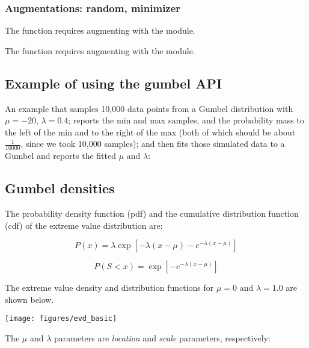 \subsubsection{Augmentations: random, minimizer}

The  function requires augmenting with the
 module.

The  function requires augmenting
with the  module.


\subsection{Example of using the gumbel API}

An example that samples 10,000 data points from a Gumbel distribution
with $\mu=-20$, $\lambda=0.4$; reports the min and max samples, and
the probability mass to the left of the min and to the right of the
max (both of which should be about $\frac{1}{10000}$, since we took
10,000 samples); and then fits those simulated data to a Gumbel and
reports the fitted $\mu$ and $\lambda$:





\subsection{Gumbel densities}

The probability density function (pdf) and the cumulative distribution
function (cdf) of the extreme value distribution are:

\begin{equation}
P(x) = \lambda \exp \left[ -\lambda (x - \mu) - e^{- \lambda (x - \mu)} \right]
\label{eqn:gumbel_density}
\end{equation}

\begin{equation}
P(S < x) = \exp \left[ -e^{-\lambda(x - \mu)} \right]
\label{eqn:gumbel_distribution}
\end{equation}

The extreme value density and distribution functions for $\mu = 0$ and
$\lambda = 1.0$ are shown below.

\begin{center}
\texttt{[image: figures/evd\_basic]}
\end{center}

The $\mu$ and $\lambda$ parameters are {\em location} and {\em scale}
parameters, respectively:

